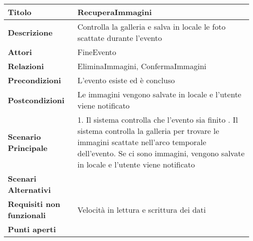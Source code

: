\begin{tabular} {|P{4.5cm}|P{11cm}|}
  \hline
  \textbf{Titolo}                   & RecuperaImmagini                                                          \\
  \hline
  \textbf{Descrizione}              & Controlla la galleria e salva in locale le foto scattate durante l'evento \\
  \hline
  \textbf{Attori}                   & FineEvento                                                                \\
  \hline
  \textbf{Relazioni}                & EliminaImmagini, ConfermaImmagini                                         \\
  \hline
  \textbf{Precondizioni}            & L'evento esiste ed è concluso                                             \\
  \hline
  \textbf{Postcondizioni}           & Le immagini vengono salvate in locale e l'utente viene notificato         \\
  \hline
  \textbf{Scenario Principale}      & 1. Il sistema controlla che l'evento sia finito . Il sistema controlla la galleria per trovare le immagini scattate nell'arco temporale dell'evento. Se ci sono immagini, vengono salvate in locale e l'utente viene notificato                                 \\
  \hline
  \textbf{Scenari Alternativi}      &                                                                           \\
  \hline
  \textbf{Requisiti non funzionali} & Velocità in lettura e scrittura dei dati                                  \\
  \hline
  \textbf{Punti aperti}             &                                                                           \\
  \hline
\end{tabular}
\hfill
\break

